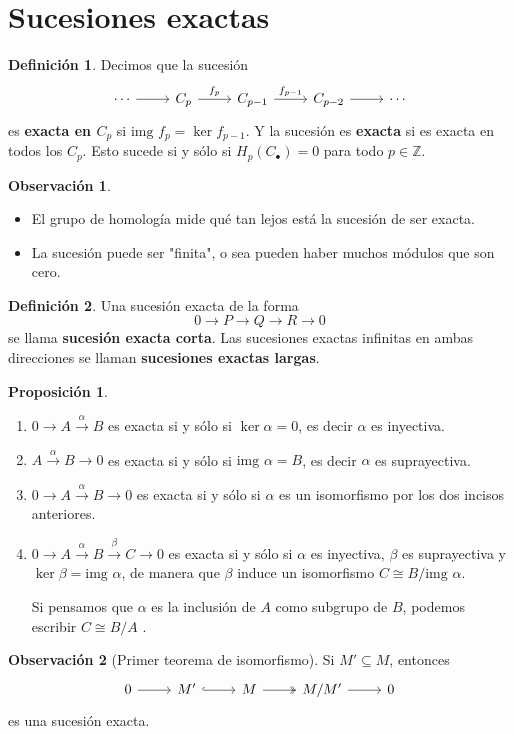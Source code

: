 \documentclass{book}
\theoremstyle{definition}
\newtheorem*{defn}{Definición}
\newtheorem*{obs}{Observación}
\newtheorem*{prop}{Proposición}
\begin{document}
	\section{Sucesiones exactas}
	\begin{defn}
		Decimos que la sucesión 
		\[
		\begin{tikzcd}
			\cdots \arrow{r} & C_p \arrow{r}{f_p} & C_{p-1} \arrow{r}{f_{p-1}} & C_{p-2} \arrow{r} & \cdots
		\end{tikzcd}
		\]
		es \textbf{exacta en $C_p$} si  $\text{img }f_p=\ker{f_{p-1}}$. Y la sucesión es \textbf{exacta} si es exacta en todos los $C_p$. Esto sucede si y sólo si $H_p(C_\bullet{})=0$ para todo $p\in\mathbb{Z}$.
	\end{defn}
	\begin{obs}\leavevmode
		\begin{itemize}
			\item El grupo de homología mide qué tan lejos está la sucesión de ser exacta.
			\item La sucesión puede ser "finita", o sea pueden haber muchos módulos que son cero.
		\end{itemize}
	\end{obs}
	\begin{defn}
		Una sucesión exacta de la forma $$0\to P\to Q\to R\to 0$$ se llama \textbf{sucesión exacta corta}. Las sucesiones exactas infinitas en ambas direcciones se llaman \textbf{sucesiones exactas largas}.
	\end{defn}
	\begin{prop}\leavevmode
		\begin{enumerate}
			\item $0\to A\xrightarrow{\alpha}B$ es exacta si y sólo si $\ker{\alpha}=0$, es decir $\alpha $ es inyectiva.
			\item $A\xrightarrow{\alpha}B\to 0$ es exacta si y sólo si $\text{img }{\alpha}=B$, es decir $\alpha $ es suprayectiva.
			\item $0\to A\xrightarrow{\alpha}B\to 0$ es exacta si y sólo si $\alpha $ es un isomorfismo por los dos incisos anteriores.
			\item $0\to A\xrightarrow{\alpha}B\xrightarrow{\beta} C\to0$ es exacta si y sólo si $\alpha$ es inyectiva, $\beta$ es suprayectiva y $\ker\beta=\text{img }\alpha$, de manera que $\beta$ induce un isomorfismo $C\cong B/\text{img }\alpha$.\par
			Si pensamos que $\alpha$ es la inclusión de $A$ como subgrupo de $B$, podemos escribir $C\cong B/A$ .
		\end{enumerate}
	\end{prop}
	\begin{obs}[Primer teorema de isomorfismo] Si $M'\subseteq M$, entonces
		\[
		\begin{tikzcd}
			0 \arrow{r} & M' \arrow[hookrightarrow]{r} & M \arrow[twoheadrightarrow]{r} & M/M' \arrow{r} & 0
		\end{tikzcd}
		\]
		es una sucesión exacta.
	\end{obs}
\end{document}
